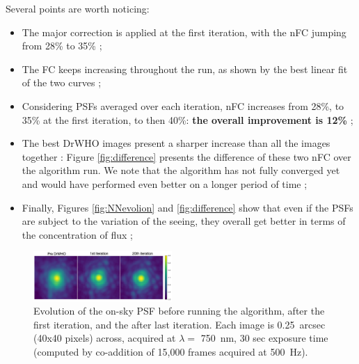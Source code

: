 \documentclass[twocolumn]{aa}
\begin{document}
Several points are worth noticing: 
\begin{itemize}
    \item The major correction is applied at the first iteration, with the nFC jumping from 28\% to 35\% ; 
    \item The FC keeps increasing throughout the run, as shown by the best linear fit of the two curves ;
    \item Considering PSFs averaged over each iteration, nFC increases from 28\%, to 35\% at the first iteration, to then 40\%: \textbf{the overall improvement is 12\%} ; 
    \item The best DrWHO images present a sharper increase than all the images together : Figure \ref{fig:difference} presents the difference of these two nFC over the algorithm run. We note that the algorithm has not fully converged yet and would have performed even better on a longer period of time ; 
    \item Finally, Figures \ref{fig:NNevolion} and \ref{fig:difference} show that even if the PSFs are subject to the variation of the seeing, they overall get better in terms of the concentration of flux ;
\end{itemize}



\begin{figure}[t]
\includegraphics[width=0.47\textwidth]{fig/Dec7nightresult.png}
\caption{Evolution of the on-sky PSF before running the algorithm, after the first iteration, and the after last iteration. Each image is 0.25~arcsec (40x40 pixels) across, acquired at $\lambda = $ 750~nm, 30 sec exposure time (computed by co-addition of 15,000 frames acquired at 500~Hz).}
\label{fig:SkyResult}
\end{figure}
\end{document}
